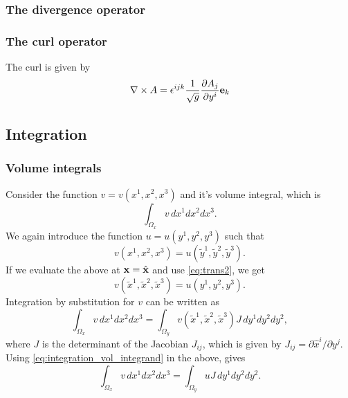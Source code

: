\documentclass[11pt]{article}
\newcommand{\xtilde}{\tilde{x}}
\newcommand{\ytilde}{\tilde{y}}
\begin{document}
\subsubsection{The divergence operator}

\subsubsection{The curl operator}
The curl is given by
\begin{equation}
    \nabla \times A = \epsilon^{ijk} \frac{1}{\sqrt{g}} \frac{\partial A_j}{\partial y^i} \mathbf{e}_k
\end{equation}

\subsection{Integration}

\subsubsection{Volume integrals}
Consider the function $v = v(x^1, x^2, x^3)$ and it's volume integral, which is
\begin{equation}
    \int_{\Omega_x} v \, dx^1 dx^2 dx^3.
\end{equation}
We again introduce the function $u = u(y^1, y^2, y^3)$ such that
\begin{equation}
    v(x^1, x^2, x^3) = u(\ytilde^1, \ytilde^2, \ytilde^3).
\end{equation}
If we evaluate the above at $\mathbf{x} = \hat{\mathbf{x}}$ and use \cref{eq:trans2}, we get
\begin{equation}
    \label{eq:integration_vol_integrand}
    v(\xtilde^1, \xtilde^2, \xtilde^3) = u(y^1, y^2, y^3).
\end{equation}
Integration by substitution for $v$ can be written as
\begin{equation}
    \int_{\Omega_x} v \, dx^1 dx^2 dx^3 = \int_{\Omega_y} v(\xtilde^1, \xtilde^2, \xtilde^3) J \, dy^1 dy^2 dy^2,
\end{equation}
where $J$ is the determinant of the Jacobian $J_{ij}$, which is given by $J_{ij} = \partial \hat{x}^i / \partial y^j$.
Using \cref{eq:integration_vol_integrand} in the above, gives
\begin{equation}
    \int_{\Omega_x} v \, dx^1 dx^2 dx^3 = \int_{\Omega_y} u J \, dy^1 dy^2 dy^2.
\end{equation}
\end{document}
